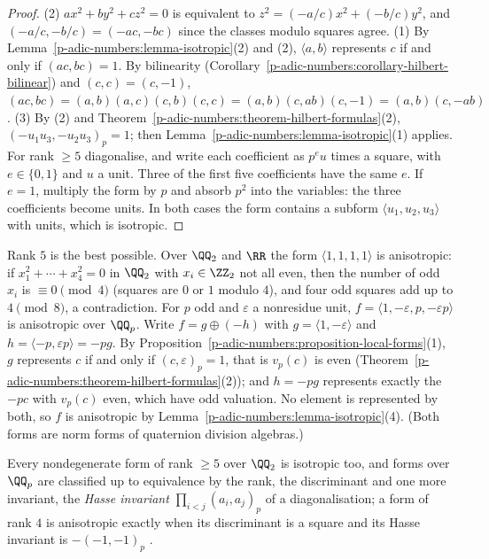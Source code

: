 \begin{proof}
(2) $ax^2 + by^2 + cz^2 = 0$ is equivalent to $z^2 = (-a/c)x^2 + (-b/c)y^2$, and $(-a/c, -b/c) = (-ac, -bc)$ since the classes modulo squares agree.
(1) By Lemma~\ref{p-adic-numbers:lemma-isotropic}(2) and (2), $\langle a, b\rangle$ represents $c$ if and only if $(ac, bc) = 1$. By bilinearity (Corollary~\ref{p-adic-numbers:corollary-hilbert-bilinear}) and
$(c, c) = (c, -1)$, $(ac, bc) = (a, b)(a, c)(c, b)(c, c) = (a, b)(c, ab)(c, -1) = (a, b)(c, -ab)$.
(3) By (2) and Theorem~\ref{p-adic-numbers:theorem-hilbert-formulas}(2), $(-u_1u_3, -u_2u_3)_p = 1$; then Lemma~\ref{p-adic-numbers:lemma-isotropic}(1) applies. For rank $\geq 5$ diagonalise, and write each
coefficient as $p^eu$ times a square, with $e \in \{0, 1\}$ and $u$ a unit. Three of the first five coefficients have the same $e$. If $e = 1$, multiply the form by $p$ and absorb $p^2$ into the
variables: the three coefficients become units. In both cases the form contains a subform $\langle u_1, u_2, u_3\rangle$ with units, which is isotropic.
\end{proof}

\begin{example}\label{p-adic-numbers:example-anisotropic}
Rank $5$ is the best possible. Over $\QQ_2$ and $\RR$ the form $\langle 1, 1, 1, 1\rangle$ is anisotropic: if $x_1^2 + \cdots + x_4^2 = 0$ in $\QQ_2$ with $x_i \in \ZZ_2$ not all even, then the number of odd $x_i$ is
$\equiv 0 \pmod 4$ (squares are $0$ or $1$ modulo $4$), and four odd squares add up to $4 \pmod 8$, a contradiction. For $p$ odd and $\varepsilon$ a nonresidue unit, $f = \langle 1, -\varepsilon, p, -\varepsilon p\rangle$ is
anisotropic over $\QQ_p$. Write $f = g \oplus (-h)$ with $g = \langle 1, -\varepsilon\rangle$ and $h = \langle -p, \varepsilon p\rangle = -pg$. By Proposition~\ref{p-adic-numbers:proposition-local-forms}(1), $g$ represents
$c$ if and only if $(c, \varepsilon)_p = 1$, that is $v_p(c)$ is even (Theorem~\ref{p-adic-numbers:theorem-hilbert-formulas}(2)); and $h = -pg$ represents exactly the $-pc$ with $v_p(c)$ even, which have odd
valuation. No element is represented by both, so $f$ is anisotropic by Lemma~\ref{p-adic-numbers:lemma-isotropic}(4). (Both forms are norm forms of quaternion division algebras.)
\end{example}

\begin{remark}\label{p-adic-numbers:remark-local-classification}
Every nondegenerate form of rank $\geq 5$ over $\QQ_2$ is isotropic too, and forms over $\QQ_p$ are classified up to equivalence by the rank, the discriminant and one more invariant, the \emph{Hasse invariant}
$\prod_{i<j}(a_i, a_j)_p$ of a diagonalisation; a form of rank $4$ is anisotropic exactly when its discriminant is a square and its Hasse invariant is $-(-1, -1)_p$ \cite[Chapter IV, Theorems 6 and 7]{serre-arithmetic}.
\end{remark}

